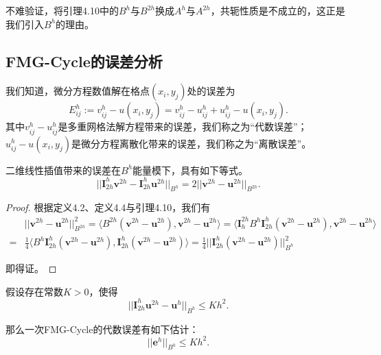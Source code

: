 \documentclass[lang=cn,10pt]{elegantbook}
\begin{document}
不难验证，将引理4.10中的$B^h$与$B^{2h}$换成$A^h$与$A^{2h}$，共轭性质是不成立的，这正是我们引入$B^h$的理由。

\subsection{FMG-Cycle的误差分析}

\begin{definition}
  我们知道，微分方程数值解在格点$(x_i,y_j)$处的误差为
  \begin{equation*}
    E_{ij}^h:=v^h_{ij}-u(x_i,y_j)=v_{ij}^h-u_{ij}^h+u_{ij}^h-u(x_i,y_j).
  \end{equation*}
  其中$v_{ij}^h-u_{ij}^h$是多重网格法解方程带来的误差，我们称之为“代数误差”；$u_{ij}^h-u(x_i,y_j)$是微分方程离散化带来的误差，我们称之为“离散误差”。
\end{definition}

\begin{lemma}
二维线性插值带来的误差在$B^h$能量模下，具有如下等式。
\begin{equation}
  ||\mathbf{I}_{2h}^h\mathbf{v}^{2h}-\mathbf{I}_{2h}^h\mathbf{u}^{2h}||_{B^h}=2||\mathbf{v}^{2h}-\mathbf{u}^{2h}||_{B^{2h}}.
\end{equation}
\end{lemma}

\begin{proof}
  根据定义4.2、定义4.4与引理4.10，我们有
  \begin{align*}
    & ||\mathbf{v}^{2h}-\mathbf{u}^{2h}||^2_{B^{2h}} = \langle B^{2h}(\mathbf{v}^{2h}-\mathbf{u}^{2h}), \mathbf{v}^{2h}-\mathbf{u}^{2h} \rangle = \langle \mathbf{I}_h^{2h}B^{h}\mathbf{I}_{2h}^h(\mathbf{v}^{2h}-\mathbf{u}^{2h}), \mathbf{v}^{2h}-\mathbf{u}^{2h} \rangle\\
    =& \frac{1}{4}\langle B^{h}\mathbf{I}_{2h}^h(\mathbf{v}^{2h}-\mathbf{u}^{2h}), \mathbf{I}_{2h}^{h}(\mathbf{v}^{2h}-\mathbf{u}^{2h}) \rangle =\frac{1}{4}||\mathbf{I}_{2h}^h(\mathbf{v}^{2h}-\mathbf{u}^{2h})||^2_{B^h}
  \end{align*}

  即得证。
\end{proof}

\begin{lemma}
  假设存在常数$K>0$，使得
  \begin{equation}
    ||\mathbf{I}_{2h}^h \mathbf{u}^{2h}-\mathbf{u}^{h}||_{B^h}\leq Kh^2.
  \end{equation}

  那么一次FMG-Cycle的代数误差有如下估计：
  \begin{equation}
    ||\mathbf{e}^h||_{B^h}\leq Kh^2.
  \end{equation}
\end{lemma}
\end{document}
